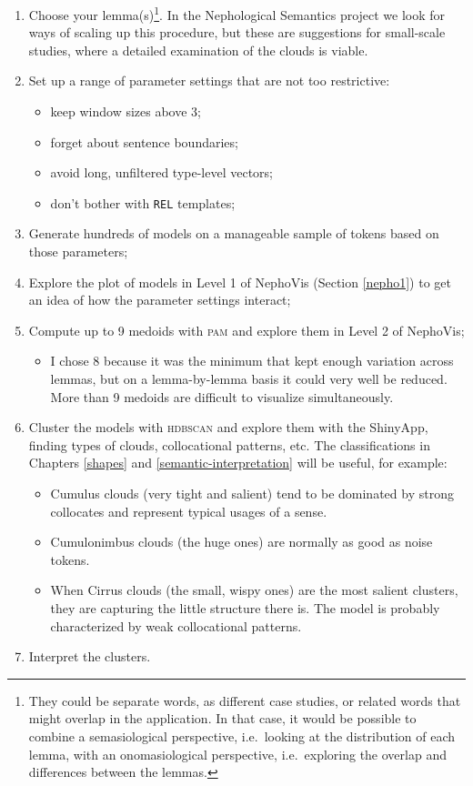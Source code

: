 \documentclass[
]{book}
\providecommand{\tightlist}{%
  \setlength{\itemsep}{0pt}\setlength{\parskip}{0pt}}
\begin{document}
\begin{enumerate}
\def\labelenumi{\arabic{enumi}.}
\item
  Choose your lemma(s)\footnote{They could be separate words, as different case studies, or related words that might overlap in the application. In that case, it would be possible to combine a semasiological perspective, i.e.~looking at the distribution of each lemma, with an onomasiological perspective, i.e.~exploring the overlap and differences between the lemmas.}. In the Nephological Semantics project we look for ways of scaling up this procedure, but these are suggestions for small-scale studies, where a detailed examination of the clouds is viable.
\item
  Set up a range of parameter settings that are not too restrictive:

  \begin{itemize}
  \tightlist
  \item
    keep window sizes above 3;
  \item
    forget about sentence boundaries;
  \item
    avoid long, unfiltered type-level vectors;
  \item
    don't bother with \texttt{REL} templates;
  \end{itemize}
\item
  Generate hundreds of models on a manageable sample of tokens based on those parameters;
\item
  Explore the plot of models in Level 1 of NephoVis (Section \ref{nepho1}) to get an idea of how the parameter settings interact;
\item
  Compute up to 9 medoids with \textsc{pam} and explore them in Level 2 of NephoVis;

  \begin{itemize}
  \tightlist
  \item
    I chose 8 because it was the minimum that kept enough variation across lemmas, but on a lemma-by-lemma basis it could very well be reduced. More than 9 medoids are difficult to visualize simultaneously.
  \end{itemize}
\item
  Cluster the models with \textsc{hdbscan} and explore them with the ShinyApp, finding types of clouds, collocational patterns, etc. The classifications in Chapters \ref{shapes} and \ref{semantic-interpretation} will be useful, for example:

  \begin{itemize}
  \tightlist
  \item
    Cumulus clouds (very tight and salient) tend to be dominated by strong collocates and represent typical usages of a sense.
  \item
    Cumulonimbus clouds (the huge ones) are normally as good as noise tokens.
  \item
    When Cirrus clouds (the small, wispy ones) are the most salient clusters, they are capturing the little structure there is. The model is probably characterized by weak collocational patterns.
  \end{itemize}
\item
  Interpret the clusters.


\end{enumerate}
\end{document}
